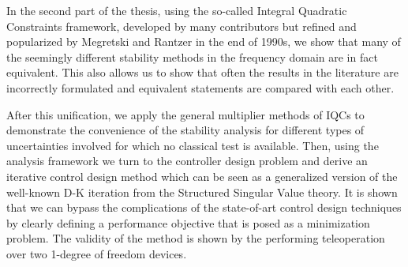 In the second part of the thesis, using the so-called Integral Quadratic Constraints framework, developed by many contributors but 
refined and popularized by Megretski and Rantzer in the end of 1990s, we show that many of the seemingly different stability methods in 
the frequency domain are in fact equivalent. This also allows us to show that often the results in the literature are incorrectly 
formulated and equivalent statements are compared with each other. 

After this unification, we apply the general multiplier methods of IQCs to demonstrate the convenience of the stability analysis for 
different types of uncertainties involved for which no classical test is available. Then, using the analysis framework we turn to the 
controller design problem and derive an iterative control design method which can be seen as a generalized version of  the well-known D-K 
iteration from the Structured Singular Value theory. It is shown that we can bypass the complications of the state-of-art control design 
techniques by clearly defining a performance objective that is posed as a minimization problem. The validity of the method is shown by 
the performing teleoperation over two 1-degree of freedom devices. 

